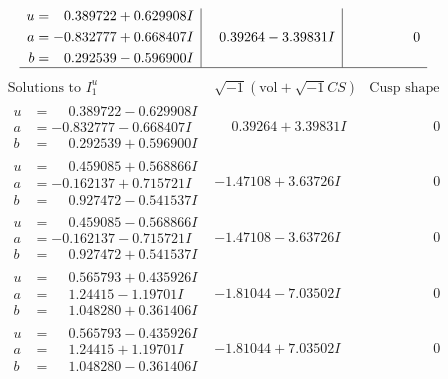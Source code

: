 \documentclass[1p]{elsarticle_modified}
\theoremstyle{definition}
\newcommand{\I}{\sqrt{-1}}
\begin{document}
$$\begin{array}{c|c|c}
\begin{aligned}
u &= \phantom{-}0.389722 + 0.629908 I \\
a &= -0.832777 + 0.668407 I \\
b &= \phantom{-}0.292539 - 0.596900 I\end{aligned}
 & \phantom{-}0.39264 - 3.39831 I & \phantom{-0.000000 } 0\\
 \hline 
 \end{array}$$\newpage$$\begin{array}{c|c|c}  
\text{Solutions to }I^u_{1}& \I (\text{vol} + \sqrt{-1}CS) & \text{Cusp shape}\\
 \hline 
\begin{aligned}
u &= \phantom{-}0.389722 - 0.629908 I \\
a &= -0.832777 - 0.668407 I \\
b &= \phantom{-}0.292539 + 0.596900 I\end{aligned}
 & \phantom{-}0.39264 + 3.39831 I & \phantom{-0.000000 } 0 \\ \hline\begin{aligned}
u &= \phantom{-}0.459085 + 0.568866 I \\
a &= -0.162137 + 0.715721 I \\
b &= \phantom{-}0.927472 - 0.541537 I\end{aligned}
 & -1.47108 + 3.63726 I & \phantom{-0.000000 } 0 \\ \hline\begin{aligned}
u &= \phantom{-}0.459085 - 0.568866 I \\
a &= -0.162137 - 0.715721 I \\
b &= \phantom{-}0.927472 + 0.541537 I\end{aligned}
 & -1.47108 - 3.63726 I & \phantom{-0.000000 } 0 \\ \hline\begin{aligned}
u &= \phantom{-}0.565793 + 0.435926 I \\
a &= \phantom{-}1.24415 - 1.19701 I \\
b &= \phantom{-}1.048280 + 0.361406 I\end{aligned}
 & -1.81044 - 7.03502 I & \phantom{-0.000000 } 0 \\ \hline\begin{aligned}
u &= \phantom{-}0.565793 - 0.435926 I \\
a &= \phantom{-}1.24415 + 1.19701 I \\
b &= \phantom{-}1.048280 - 0.361406 I\end{aligned}
 & -1.81044 + 7.03502 I & \phantom{-0.000000 } 0 \\ \hline\begin{aligned}

\end{aligned}
\end{array}$$
\end{document}
